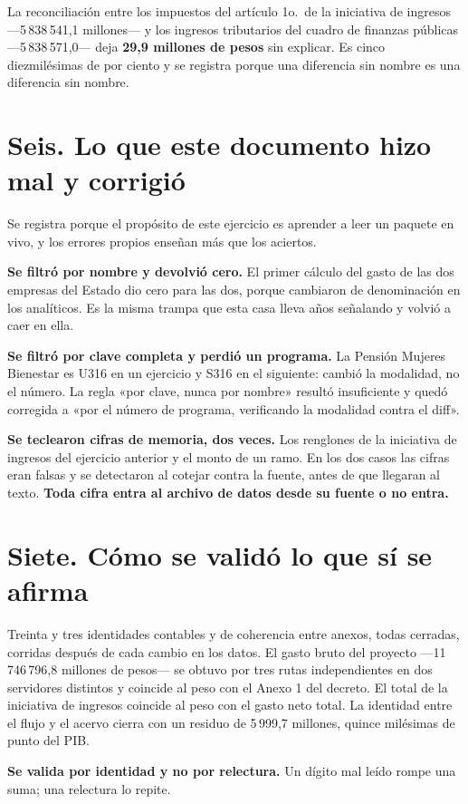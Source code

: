 La reconciliación entre los impuestos del artículo 1o.\ de la iniciativa de ingresos
---5\,838\,541,1 millones--- y los ingresos tributarios del cuadro de finanzas públicas
---5\,838\,571,0--- deja \textbf{29,9 millones de pesos} sin explicar. Es cinco diezmilésimas
de por ciento y se registra porque una diferencia sin nombre es una diferencia sin nombre.

\section*{Seis. Lo que este documento hizo mal y corrigió}

Se registra porque el propósito de este ejercicio es aprender a leer un paquete en vivo, y los
errores propios enseñan más que los aciertos.

\begin{list}{}{\setlength{\leftmargin}{1.4em}\setlength{\itemsep}{3pt}}
\item[1.] \textbf{Se filtró por nombre y devolvió cero.} El primer cálculo del gasto de las dos
empresas del Estado dio cero para las dos, porque cambiaron de denominación en los analíticos.
Es la misma trampa que esta casa lleva años señalando y volvió a caer en ella.
\item[2.] \textbf{Se filtró por clave completa y perdió un programa.} La Pensión Mujeres
Bienestar es U316 en un ejercicio y S316 en el siguiente: cambió la modalidad, no el número. La
regla «por clave, nunca por nombre» resultó insuficiente y quedó corregida a «por el número de
programa, verificando la modalidad contra el diff».
\item[3.] \textbf{Se teclearon cifras de memoria, dos veces.} Los renglones de la iniciativa de
ingresos del ejercicio anterior y el monto de un ramo. En los dos casos las cifras eran falsas y
se detectaron al cotejar contra la fuente, antes de que llegaran al texto. \textbf{Toda cifra
entra al archivo de datos desde su fuente o no entra.}
\end{list}

\section*{Siete. Cómo se validó lo que sí se afirma}

Treinta y tres identidades contables y de coherencia entre anexos, todas cerradas, corridas
después de cada cambio en los datos. El gasto bruto del proyecto ---11\,746\,796,8 millones de
pesos--- se obtuvo por tres rutas independientes en dos servidores distintos y coincide al peso
con el Anexo 1 del decreto. El total de la iniciativa de ingresos coincide al peso con el gasto
neto total. La identidad entre el flujo y el acervo cierra con un residuo de 5\,999,7 millones,
quince milésimas de punto del PIB.

\textbf{Se valida por identidad y no por relectura.} Un dígito mal leído rompe una suma; una
relectura lo repite.
\clearpage
